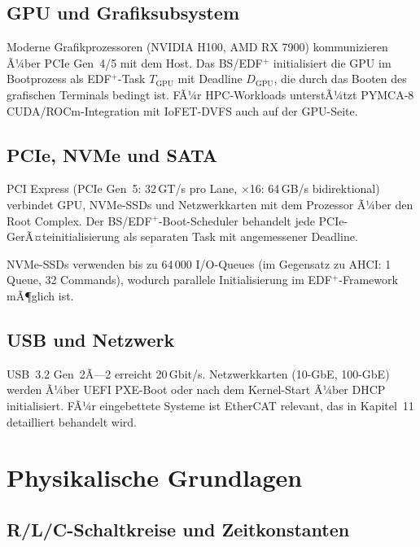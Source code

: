﻿\documentclass[a4paper,12pt]{scrreprt}
\theoremstyle{definition}
\begin{document}
	\section{GPU und Grafiksubsystem}
	
	Moderne Grafikprozessoren (NVIDIA H100, AMD RX 7900) kommunizieren Ã¼ber
	PCIe Gen~4/5 mit dem Host. Das BS/EDF$^+$ initialisiert die GPU im
	Bootprozess als EDF$^+$-Task $T_{\text{GPU}}$ mit Deadline $D_{\text{GPU}}$,
	die durch das Booten des grafischen Terminals bedingt ist.
	FÃ¼r HPC-Workloads unterstÃ¼tzt PYMCA-8 \cite{Epp2026pymca8} CUDA/ROCm-Integration
	mit IoFET-DVFS auch auf der GPU-Seite.
	
	\section{PCIe, NVMe und SATA}
	
	PCI Express (PCIe Gen~5: 32\,GT/s pro Lane, $\times$16: 64\,GB/s bidirektional)
	verbindet GPU, NVMe-SSDs und Netzwerkkarten mit dem Prozessor Ã¼ber den
	Root Complex. Der BS/EDF$^+$-Boot-Scheduler behandelt jede PCIe-GerÃ¤teinitiali\-sierung
	als separaten Task mit angemessener Deadline.
	
	NVMe-SSDs verwenden bis zu 64\,000 I/O-Queues (im Gegensatz zu AHCI: 1 Queue,
	32 Commands), wodurch parallele Initialisierung im EDF$^+$-Framework mÃ¶glich ist.
	
	\section{USB und Netzwerk}
	
	USB~3.2 Gen~2Ã—2 erreicht 20\,Gbit/s. Netzwerkkarten (10-GbE, 100-GbE) werden
	Ã¼ber UEFI PXE-Boot oder nach dem Kernel-Start Ã¼ber DHCP initialisiert.
	FÃ¼r eingebettete Systeme ist EtherCAT \cite{IEC61158} relevant, das in
	Kapitel~11 detailliert behandelt wird.
	
	\chapter{Physikalische Grundlagen}
	
	\section{R/L/C-Schaltkreise und Zeitkonstanten}
\end{document}

